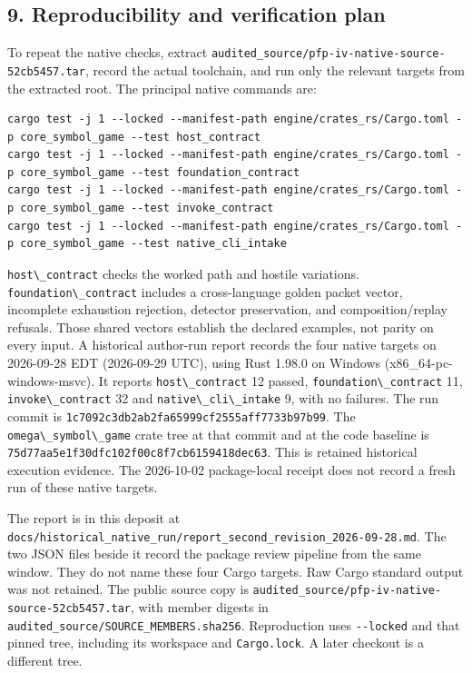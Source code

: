 \documentclass[
  11pt,
]{article}
\newcommand{\passthrough}[1]{#1}
\begin{document}
\subsection{9. Reproducibility and verification
plan}\label{reproducibility-and-verification-plan}

To repeat the native checks, extract
\nolinkurl{audited_source/pfp-iv-native-source-52cb5457.tar}, record the
actual toolchain, and run only the relevant targets from the extracted
root. The principal native commands are:

\begin{lstlisting}
cargo test -j 1 --locked --manifest-path engine/crates_rs/Cargo.toml -p core_symbol_game --test host_contract
cargo test -j 1 --locked --manifest-path engine/crates_rs/Cargo.toml -p core_symbol_game --test foundation_contract
cargo test -j 1 --locked --manifest-path engine/crates_rs/Cargo.toml -p core_symbol_game --test invoke_contract
cargo test -j 1 --locked --manifest-path engine/crates_rs/Cargo.toml -p core_symbol_game --test native_cli_intake
\end{lstlisting}

\passthrough{\lstinline!host\_contract!} checks the worked path and
hostile variations. \passthrough{\lstinline!foundation\_contract!}
includes a cross-language golden packet vector, incomplete exhaustion
rejection, detector preservation, and composition/replay refusals. Those
shared vectors establish the declared examples, not parity on every
input. A historical author-run report records the four native targets on
2026-09-28 EDT (2026-09-29 UTC), using Rust 1.98.0 on Windows
(x86\_64-pc-windows-msvc). It reports
\passthrough{\lstinline!host\_contract!} 12 passed,
\passthrough{\lstinline!foundation\_contract!} 11,
\passthrough{\lstinline!invoke\_contract!} 32 and
\passthrough{\lstinline!native\_cli\_intake!} 9, with no failures. The
run commit is \nolinkurl{1c7092c3db2ab2fa65999cf2555aff7733b97b99}. The
\passthrough{\lstinline!omega\_symbol\_game!} crate tree at that commit
and at the code baseline is
\nolinkurl{75d77aa5e1f30dfc102f00c8f7cb6159418dec63}. This is retained
historical execution evidence. The 2026-10-02 package-local receipt does
not record a fresh run of these native targets.

The report is in this deposit at
\nolinkurl{docs/historical_native_run/report_second_revision_2026-09-28.md}.
The two JSON files beside it record the package review pipeline from the
same window. They do not name these four Cargo targets. Raw Cargo
standard output was not retained. The public source copy is
\nolinkurl{audited_source/pfp-iv-native-source-52cb5457.tar}, with
member digests in \nolinkurl{audited_source/SOURCE_MEMBERS.sha256}.
Reproduction uses \passthrough{\lstinline!--locked!} and that pinned
tree, including its workspace and \passthrough{\lstinline!Cargo.lock!}.
A later checkout is a different tree.
\end{document}
